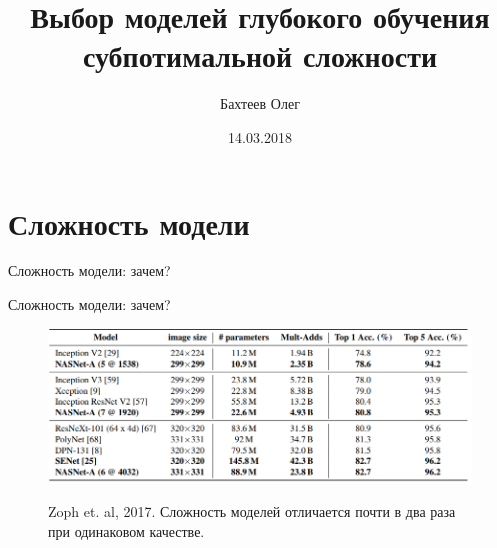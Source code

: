 \documentclass[10pt,pdf,utf8,russian,aspectratio=169]{beamer}
\title[Выбор моделей]{Выбор моделей глубокого обучения субпотимальной сложности}
\author{Бахтеев Олег}
\institute{МФТИ}
\date{14.03.2018}
\begin{document}
\begin{frame}
  \titlepage
\end{frame}


\section{Сложность модели}
\begin{frame}{Сложность модели: зачем?}
\begin{figure}
  \centering
\label{fig:1}\qquad

\end{figure}


\end{frame}

\begin{frame}{Сложность модели: зачем?}

\begin{figure}
  \centering
 {\includegraphics[width=\textwidth]{zoph.png}}
\label{fig:1}\qquad
\caption*{Zoph et. al, 2017.  Сложность моделей отличается почти в два раза при одинаковом качестве.}
\end{figure}
\end{frame}
\end{document}
